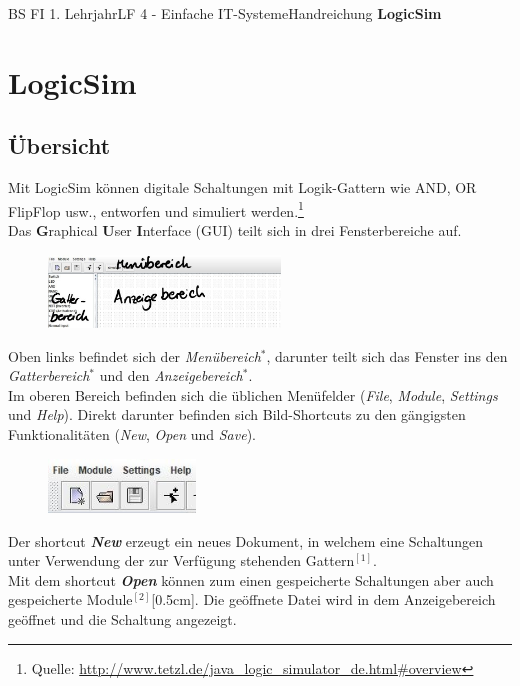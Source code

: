 \documentclass[11pt,oneside,openany,headings=optiontotoc,11pt,numbers=noenddot]{article}
\begin{document}
	\begin{worksheet}{BS FI 1. Lehrjahr}{LF 4 - Einfache IT-Systeme}{Handreichung \textbf{LogicSim}}
		\section*{LogicSim}
		\subsection*{Übersicht}
		
		\glqq{}Mit LogicSim können digitale Schaltungen mit Logik-Gattern wie AND, OR FlipFlop usw., entworfen und simuliert werden.\grqq{}\footnote{Quelle: \url{http://www.tetzl.de/java\_logic\_simulator\_de.html\#overview}}\\
		Das \textbf{G}raphical \textbf{U}ser \textbf{I}nterface (GUI) teilt sich in drei Fensterbereiche auf.
		\begin{figure}
			\includegraphics[width=0.55\textwidth]{../99_Bilder/LS.jpg}
		\end{figure}
		Oben links befindet sich der \textit{Menübereich}\(^*\), darunter teilt sich das Fenster ins den \textit{Gatterbereich}\(^*\) und den \textit{Anzeigebereich}\(^*\).\\
		Im oberen Bereich befinden sich die üblichen Menüfelder (\textit{File}, \textit{Module}, \textit{Settings} und \textit{Help}). Direkt darunter befinden sich Bild-Shortcuts zu den gängigsten Funktionalitäten (\textit{New}, \textit{Open} und \textit{Save}).\\
		\par\noindent
		\begin{figure}
			\vspace{-10pt}
			\includegraphics[width=0.35\textwidth]{../99_Bilder/menu_LS.jpg}
		\end{figure}
		Der shortcut \textit{\textbf{New}} erzeugt ein neues Dokument, in welchem eine Schaltungen unter Verwendung der zur Verfügung stehenden Gattern\(^{[1]}\).\\
		Mit dem shortcut \textit{\textbf{Open}} können zum einen gespeicherte Schaltungen aber auch gespeicherte Module\(^{[2]}\)[0.5cm]. Die geöffnete Datei wird in dem Anzeigebereich geöffnet und die Schaltung angezeigt.

\end{worksheet}
\end{document}
